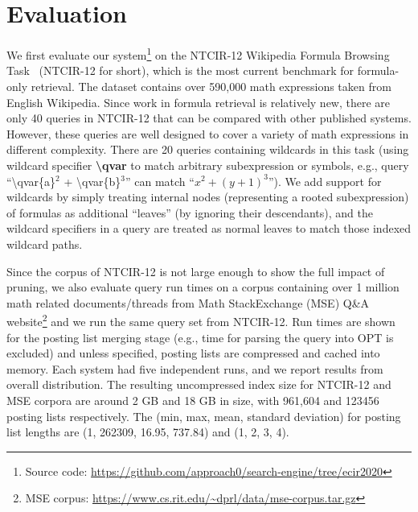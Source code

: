 \documentclass[runningheads]{llncs}
\begin{document}
\section{Evaluation}
We first evaluate our system\footnote{Source code: \url{https://github.com/approach0/search-engine/tree/ecir2020}} on the NTCIR-12 Wikipedia Formula Browsing Task~\cite{ntcir12} (NTCIR-12 for short), which is the most current benchmark for formula-only retrieval.
The dataset contains over 590,000 math expressions taken from English Wikipedia.
%
Since work in formula retrieval is relatively new, there are only 40 queries in NTCIR-12 that can be compared with other published systems. However, these queries are well designed to cover a variety of math expressions in different complexity.
There are 20 queries containing wildcards in this task (using wildcard specifier \textbf{\textbackslash{}qvar} to match arbitrary subexpression or symbols, e.g., query ``\textbackslash qvar\{a\}$^2$ + \textbackslash qvar\{b\}$^3$'' can match ``$x^2 + (y + 1)^3$'').
%
We add support for wildcards by simply treating internal nodes (representing a rooted subexpression) of formulas as additional ``leaves'' (by ignoring their descendants), and the wildcard specifiers in a query are treated as normal leaves to match those indexed wildcard paths.

Since the corpus of NTCIR-12 is not large enough to show the full impact of pruning, we also evaluate query run times on a corpus containing over 1 million math related documents/threads from Math StackExchange (MSE) Q\&A website\footnote{MSE corpus: \url{https://www.cs.rit.edu/~dprl/data/mse-corpus.tar.gz}} and we run the same query set from NTCIR-12.
%
Run times are shown for the posting list merging stage (e.g., time for parsing the query into OPT is excluded) and unless specified, posting lists are compressed and cached into memory.
%
Each system had five independent runs, and we report results from overall distribution.
%
The resulting uncompressed index size for NTCIR-12 and MSE corpora are
around 2 GB and 18 GB in size, with 961,604 and 123456 posting lists
respectively. The (min, max, mean, standard deviation) for posting list lengths are
(1, 262309, 16.95, 737.84) and (1, 2, 3, 4).
\end{document}
